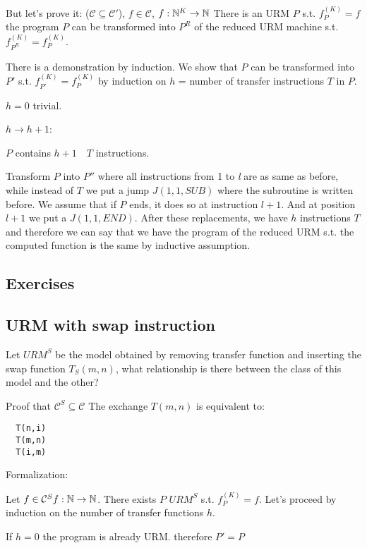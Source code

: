 But let's prove it: ($ \mathcal{C} \subseteq \mathcal{C}' $), $ f \in \mathcal{C} $, $ f: \mathbb{N}^K \rightarrow \mathbb{N} $ There is an URM $P$ s.t. $ f_P^{(K)}  = f$ the program $P$ can be transformed into $P ^R $ of the reduced URM machine s.t. $ f_{P^R}^{(K)}  = f_{P}^{(K)}$.

There is a demonstration by induction. We show that $P$ can be transformed into $P' $ s.t. $ f_{P'}^{(K)}  = f_{P}^{(K)} $ by induction on $h$ = number of transfer instructions $T$ in $P$.

$h = 0$ trivial.

$h \rightarrow  h + 1$:

$P$ contains $h + 1 \quad T$ instructions.

Transform $P$ into $P''$ where all instructions from 1 to \textit{l} are as same as before, while instead of $T$ we put a jump $J(1,1, SUB)$ where the subroutine is written before. We assume that if $P$ ends, it does so at instruction $l + 1$. And at position $l + 1$ we put a $J (1,1, END)$. After these replacements, we have $h$ instructions $T$ and therefore we can say that we have the program of the reduced URM s.t. the computed function is the same by inductive assumption.

\subsection{Exercises}

\subsection{URM with swap instruction}
Let $URM^S $ be the model obtained by removing transfer function and inserting the swap function $ T_S(m,n) $, what relationship is there between the class of this model and the other?

Proof that $ \mathcal{C}^S \subseteq \mathcal{C} $ The exchange $T (m, n)$ is equivalent to:

\begin{lstlisting}
  T(n,i)
  T(m,n)
  T(i,m)
\end{lstlisting}

Formalization:

Let $ f \in \mathcal{C}^S f:\mathbb{N}\rightarrow \mathbb{N} $. There exists $P$  $URM^S $ s.t. $ f_P^{(K)} = f $. Let's proceed by induction on the number of transfer functions $h$.

If $h = 0$ the program is already URM. therefore $ P' = P $

